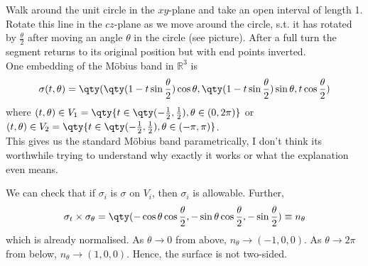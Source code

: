 \begin{example}
	Walk around the unit circle in the $xy$-plane and take an open interval of length 1.
	Rotate this line in the $cz$-plane as we move around the circle, s.t. it has rotated by $\frac{\theta}{2}$ after moving an angle $\theta$ in the circle (see picture).
	After a full turn the segment returns to its original position but with end points inverted. \\
	One embedding of the M\"obius band in $\mathbb R^3$ is
	\begin{align*}
		\sigma(t,\theta) = \qty(\qty(1 - t \sin \frac{\theta}{2})\cos \theta, \qty(1 - t \sin \frac{\theta}{2})\sin \theta, t \cos \frac{\theta}{2})
	\end{align*}
	where $(t,\theta) \in V_1 = \qty{t \in \qty(-\frac{1}{2}, \frac{1}{2}), \theta \in (0,2\pi)}$ or \\$(t,\theta) \in V_2 = \qty{t \in \qty(-\frac{1}{2}, \frac{1}{2}), \theta \in (-\pi, \pi)}$. \\
	This gives us the standard M\"obius band parametrically, I don't think its worthwhile trying to understand why exactly it works or what the explanation even means.

	We can check that if $\sigma_i$ is $\sigma$ on $V_i$, then $\sigma_i$ is allowable.
	Further,
	\begin{align*}
		\sigma_t \times \sigma_\theta = \qty(-\cos\theta \cos\frac{\theta}{2}, -\sin\theta \cos\frac{\theta}{2}, -\sin\frac{\theta}{2}) \equiv n_\theta
	\end{align*}
	which is already normalised.
	As $\theta \to 0$ from above, $n_\theta \to (-1,0,0)$.
	As $\theta \to 2\pi$ from below, $n_\theta \to (1,0,0)$.
	Hence, the surface is not two-sided.
\end{example}

